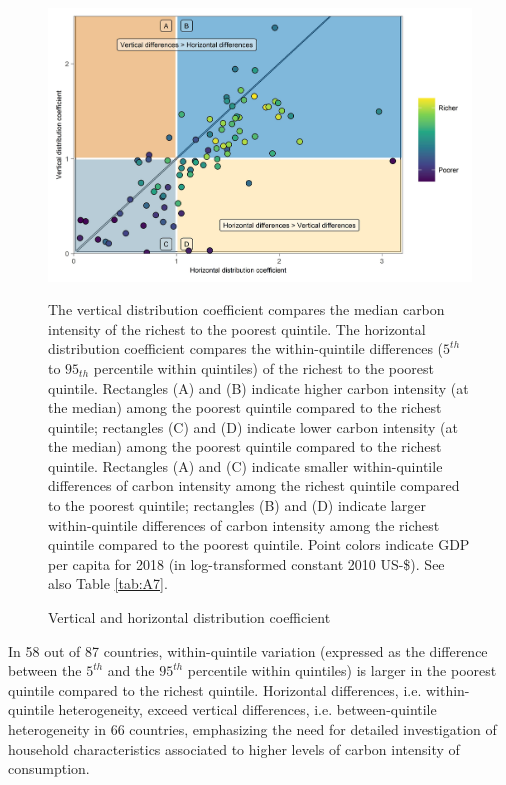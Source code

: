 \documentclass[12pt, a4paper]{article}
\newenvironment{subcaption2}
{\strut
\vspace{-5pt}
\begin{minipage}[b]{0.9\textwidth}
  \hspace*{-\parindent}
  \footnotesize}
 {\end{minipage}}
\begin{document}
\begin{figure}[ht!]
    \centering
    \includegraphics{Figure 2/Figure_2_2017}
    \caption{Vertical and horizontal distribution coefficient}
    \label{fig:fig_2}
    \begin{subcaption2}
    The vertical distribution coefficient compares the median carbon intensity of the richest to the poorest quintile. The horizontal distribution coefficient compares the within-quintile differences ($5^{th}$ to $95_{th}$ percentile within quintiles) of the richest to the poorest quintile. Rectangles (A) and (B) indicate higher carbon intensity (at the median) among the poorest quintile compared to the richest quintile; rectangles (C) and (D) indicate lower carbon intensity (at the median) among the poorest quintile compared to the richest quintile. Rectangles (A) and (C) indicate smaller within-quintile differences of carbon intensity among the richest quintile compared to the poorest quintile; rectangles (B) and (D) indicate larger within-quintile differences of carbon intensity among the richest quintile compared to the poorest quintile. Point colors indicate GDP per capita for 2018 (in log-transformed constant 2010 US-\$). See also Table \ref{tab:A7}.
    \end{subcaption2}
\end{figure}

In 58 out of 87 countries, within-quintile variation (expressed as the difference between the $5^{th}$ and the $95^{th}$ percentile within quintiles) is larger in the poorest quintile compared to the richest quintile. Horizontal differences, i.e. within-quintile heterogeneity, exceed vertical differences, i.e. between-quintile heterogeneity in 66 countries, emphasizing the need for detailed investigation of household characteristics associated to higher levels of carbon intensity of consumption.
\end{document}
